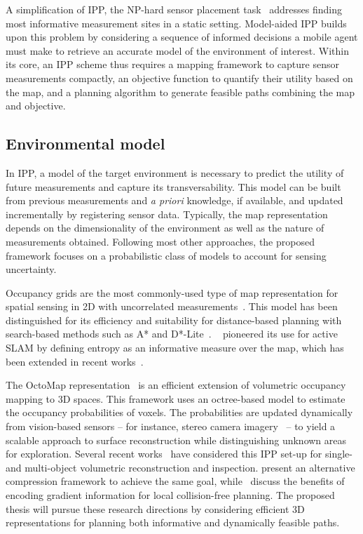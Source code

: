 A simplification of IPP, the NP-hard sensor placement task~\cite{Krause2008} addresses finding most 
informative 
measurement sites in a static setting. Model-aided IPP builds upon this problem by considering a sequence 
of informed decisions a mobile agent must make to retrieve an accurate model of the environment of interest. 
Within its core, an IPP scheme thus requires a mapping framework to capture sensor measurements compactly, an 
objective function to quantify their utility based on the map, and a planning algorithm to generate feasible 
paths combining the map and objective.

\subsection{Environmental model}

In IPP, a model of the target environment is necessary to predict the utility of future 
measurements and capture its transversability. This model can be built from previous measurements and 
\textit{a priori} knowledge, if available, and updated incrementally by registering sensor data. Typically, 
the map representation depends on the dimensionality of the environment as well as the nature of measurements 
obtained. Following most other approaches, the proposed framework focuses on a probabilistic class of models 
to account for sensing uncertainty.

Occupancy grids are the most commonly-used type of map representation for spatial sensing in 
2D with uncorrelated measurements~\cite{Elfes1989}. This model has been distinguished for its 
efficiency and suitability for distance-based planning with search-based methods such as A* and 
D*-Lite~\cite{Koenig2002}. ~\citet{Bourgault2002} pioneered its use for active SLAM by defining entropy as 
an informative measure over the map, which has been extended in recent works~\cite{Carrillo2015a}.

The OctoMap representation~\cite{Hornung2013} is an efficient extension of volumetric occupancy 
mapping to 3D spaces. This framework uses an octree-based model to estimate the occupancy probabilities of 
voxels. The probabilities are updated dynamically from vision-based sensors – for instance, stereo 
camera imagery~\cite{Isler2016} – to yield a scalable approach to surface reconstruction while 
distinguishing unknown areas for exploration. Several recent 
works~\cite{Heng2015,Bircher2016,Charrow2015a,Isler2016} have considered this IPP set-up for single- 
and multi-object volumetric reconstruction and inspection. \citet{Nelson2015} present an alternative 
compression framework to achieve the same goal, while~\citet{Oleynikova2016} discuss the 
benefits of encoding gradient information for local collision-free planning. The proposed thesis will pursue 
these research directions by considering efficient 3D representations for planning both informative and 
dynamically 
feasible paths.

